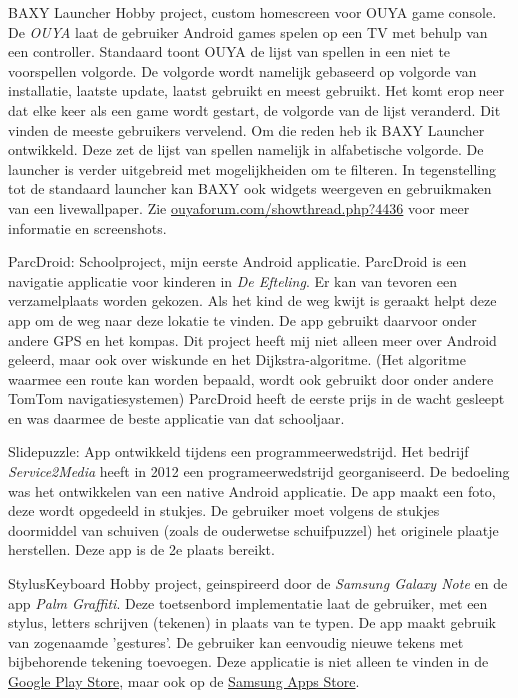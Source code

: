 \documentclass[10pt,a4paper]{article}
\begin{document}
\inlineheadsection
{BAXY Launcher}
{Hobby project, custom homescreen voor OUYA game console. De \emph{OUYA} laat de gebruiker Android games spelen op een TV met behulp van een controller. Standaard toont OUYA de lijst van spellen in een niet te voorspellen volgorde. De volgorde wordt namelijk gebaseerd op volgorde van installatie, laatste update, laatst gebruikt en meest gebruikt. Het komt erop neer dat elke keer als een game wordt gestart, de volgorde van de lijst veranderd. Dit vinden de meeste gebruikers vervelend. Om die reden heb ik BAXY Launcher ontwikkeld. Deze zet de lijst van spellen namelijk in alfabetische volgorde. De launcher is verder uitgebreid met mogelijkheiden om te filteren. In tegenstelling tot de standaard launcher kan BAXY ook widgets weergeven en gebruikmaken van een livewallpaper. Zie \href{http://ouyaforum.com/showthread.php?4436-BAXY-Custom-Launcher}{ouyaforum.com/showthread.php?4436} voor meer informatie en screenshots.}


\inlineheadsection
  {ParcDroid:}
  {Schoolproject, mijn eerste Android applicatie. ParcDroid is een navigatie applicatie voor kinderen in \emph{De Efteling}. Er kan van tevoren een verzamelplaats worden gekozen. Als het kind de weg kwijt is geraakt helpt deze app om de weg naar deze lokatie te vinden. De app gebruikt daarvoor onder andere GPS en het kompas. Dit project heeft mij niet alleen meer over Android geleerd, maar ook over wiskunde en het Dijkstra-algoritme. (Het algoritme waarmee een route kan worden bepaald, wordt ook gebruikt door onder andere TomTom navigatiesystemen) ParcDroid heeft de eerste prijs in de wacht gesleept en was daarmee de beste applicatie van dat schooljaar.}
  
\inlineheadsection
{Slidepuzzle:}
{App ontwikkeld tijdens een programmeerwedstrijd. Het bedrijf \emph{Service2Media} heeft in 2012 een programeerwedstrijd georganiseerd. De bedoeling was het ontwikkelen van een native Android applicatie. De app maakt een foto, deze wordt opgedeeld in stukjes. De gebruiker moet volgens de stukjes doormiddel van schuiven (zoals de ouderwetse schuifpuzzel) het originele plaatje herstellen. Deze app is de 2e plaats bereikt.}

\inlineheadsection
{StylusKeyboard}
{Hobby project, geinspireerd door de \emph{Samsung Galaxy Note} en de app \emph{Palm Graffiti}. Deze toetsenbord implementatie laat de gebruiker, met een stylus, letters schrijven (tekenen) in plaats van te typen. De app maakt gebruik van zogenaamde 'gestures'. De gebruiker kan eenvoudig nieuwe tekens met bijbehorende tekening toevoegen. Deze applicatie is niet alleen te vinden in de \href{https://play.google.com/store/apps/details?id=nl.frankkie.styluskeyboard}{Google Play Store}, maar ook op de \href{http://apps.samsung.com/venus/topApps/topAppsDetail.as?productId=000000499470}{Samsung Apps Store}.}
\end{document}
